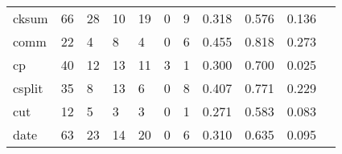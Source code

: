 \begin{longtable}{lp{1.2cm}p{1.2cm}p{1.2cm}p{1.2cm}p{1.2cm}p{1.2cm}p{1.2cm}p{1.2cm}p{1.2cm}p{1.2cm}}
cksum     &                                    66 &                                                 28 &                                                 10 &                                                 19 &                                                  0 &                                                  9 &                                         0.318 &                                              0.576 &                                              0.136 \\
comm      &                                    22 &                                                  4 &                                                  8 &                                                  4 &                                                  0 &                                                  6 &                                         0.455 &                                              0.818 &                                              0.273 \\
cp        &                                    40 &                                                 12 &                                                 13 &                                                 11 &                                                  3 &                                                  1 &                                         0.300 &                                              0.700 &                                              0.025 \\
csplit    &                                    35 &                                                  8 &                                                 13 &                                                  6 &                                                  0 &                                                  8 &                                         0.407 &                                              0.771 &                                              0.229 \\
cut       &                                    12 &                                                  5 &                                                  3 &                                                  3 &                                                  0 &                                                  1 &                                         0.271 &                                              0.583 &                                              0.083 \\
date      &                                    63 &                                                 23 &                                                 14 &                                                 20 &                                                  0 &                                                  6 &                                         0.310 &                                              0.635 &                                              0.095 \\

\end{longtable}
